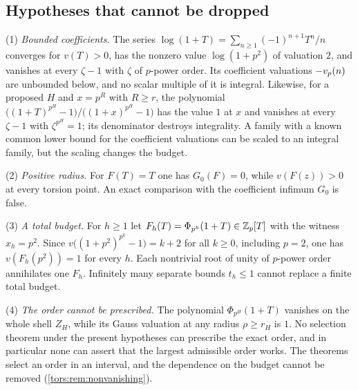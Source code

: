 
\subsection{Hypotheses that cannot be dropped}\label{tors:sec:limits}\label{cost:sec:boundary}
{\raggedright{}}

\begin{remark}\label{tors:rem:hypotheses}
(1) \emph{Bounded coefficients.} The series $\log(1+T)=\sum_{n\ge1}(-1)^{n+1}T^n/n$
converges for $v(T)>0$, has the nonzero value $\log(1+p^2)$ of valuation $2$, and
vanishes at every $\zeta-1$ with $\zeta$ of $p$-power order. Its coefficient valuations
$-v_p(n)$ are unbounded below, and no scalar multiple of it is integral. Likewise, for a
proposed $H$ and $x=p^R$ with $R\ge r$, the polynomial
$\bigl((1+T)^{p^H}-1\bigr)/\bigl((1+x)^{p^H}-1\bigr)$ has the value $1$ at $x$ and
vanishes at every $\zeta-1$ with $\zeta^{p^H}=1$; its denominator destroys integrality. A
family with a known common lower bound for the coefficient valuations can be scaled to an
integral family, but the scaling changes the budget.

(2) \emph{Positive radius.} For $F(T)=T$ one has $G_0(F)=0$, while $v(F(z))>0$ at every
torsion point. An exact comparison with the coefficient infimum $G_0$ is false.

(3) \emph{A total budget.} For $h\ge1$ let $F_h(T)=\Phi_{p^h}(1+T)\in\mathbb{Z}_p[T]$ with the
witness $x_h=p^2$. Since $v\bigl((1+p^2)^{p^k}-1\bigr)=k+2$ for all $k\ge0$, including
$p=2$, one has $v(F_h(p^2))=1$ for every $h$. Each nontrivial root of unity of $p$-power
order annihilates one $F_h$. Infinitely many separate bounds $t_h\le1$ cannot replace a
finite total budget.

(4) \emph{The order cannot be prescribed.} The polynomial $\Phi_{p^H}(1+T)$ vanishes on
the whole shell $Z_H$, while its Gauss valuation at any radius $\rho\ge r_H$ is $1$. No
selection theorem under the present hypotheses can prescribe the exact order, and in
particular none can assert that the largest admissible order works. The theorems select
an order in an interval, and the dependence on the budget cannot be removed
(\cref{tors:rem:nonvanishing}).
\end{remark}

